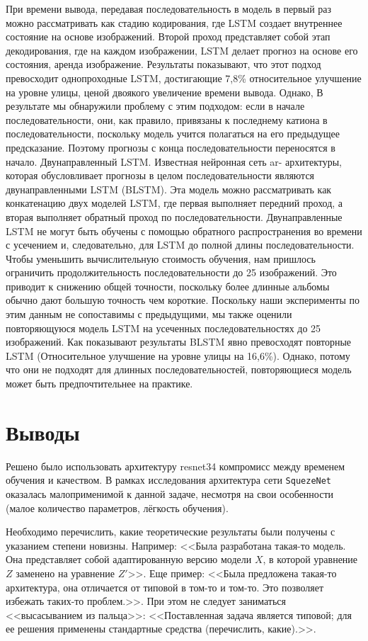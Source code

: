 При времени вывода, передавая последовательность в модель
в первый раз можно рассматривать как стадию кодирования, где
LSTM создает внутреннее состояние на основе изображений.
Второй проход представляет собой этап декодирования, где на каждом изображении,
LSTM делает прогноз на основе его состояния,
аренда изображение. Результаты показывают, что этот подход превосходит
однопроходные LSTM, достигающие 7,8\%
относительное улучшение на уровне улицы, ценой двоякого
увеличение времени вывода. Однако,
В результате мы обнаружили проблему с этим подходом:
если в начале последовательности, они, как правило, привязаны к последнему
катиона в последовательности, поскольку модель учится полагаться на
его предыдущее предсказание. Поэтому прогнозы с конца
последовательности переносятся в начало.
Двунаправленный LSTM. Известная нейронная сеть ar-
архитектуры, которая обусловливает прогнозы в целом
последовательности являются двунаправленными LSTM (BLSTM). Эта модель можно рассматривать как конкатенацию двух моделей LSTM, где первая выполняет передний проход, а вторая выполняет обратный проход по последовательности. Двунаправленные LSTM не могут быть обучены с помощью обратного распространения во времени с усечением и, следовательно, для LSTM до полной длины последовательности. Чтобы уменьшить
вычислительную стоимость обучения, нам пришлось ограничить продолжительность
последовательности до 25 изображений. Это приводит к снижению общей
точности, поскольку более длинные альбомы обычно дают
большую точность чем короткие. Поскольку наши эксперименты по этим данным
не сопоставимы с предыдущими, мы также
оценили повторяющуюся модель LSTM на усеченных последовательностях
до 25 изображений. Как показывают результаты BLSTM явно превосходят повторные LSTM
(Относительное улучшение на уровне улицы на 16,6\%). Однако,
потому что они не подходят для длинных последовательностей, повторяющиеся модель может быть предпочтительнее на практике.


\section{Выводы}

Решено было использовать архитектуру resnet34 компромисс между временем обучения и качеством. В рамках исследования архитектура сети \texttt{SquezeNet} оказалась малоприменимой к данной задаче, несмотря на свои особенности (малое количество параметров, лёгкость обучения).



Необходимо перечислить, какие теоретические результаты были получены с 
указанием степени новизны. Например: <<Была разработана такая-то модель. Она 
представляет собой адаптированную версию модели $X$, в которой уравнение $Z$ 
заменено на уравнение $Z'$>>. Еще пример: <<Была предложена такая-то 
архитектура, она отличается от типовой в том-то и том-то. Это позволяет 
избежать таких-то проблем.>>. При этом не следует заниматься <<высасыванием из 
пальца>>: <<Поставленная задача является типовой; для ее решения применены 
стандартные средства (перечислить, какие).>>.
